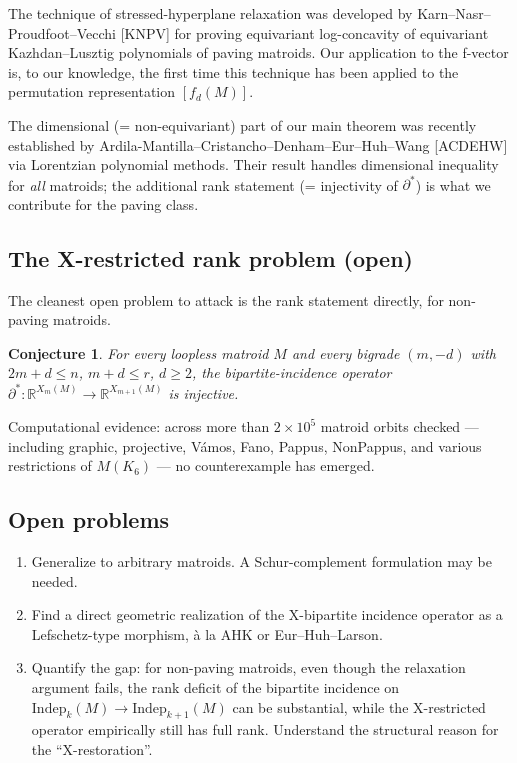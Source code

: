 \documentclass[11pt]{article}
\newtheorem{conjecture}[theorem]{Conjecture}
\theoremstyle{definition}
\newcommand{\Indep}{\mathrm{Indep}}
\begin{document}
The technique of stressed-hyperplane relaxation was developed by Karn--Nasr--Proudfoot--Vecchi [KNPV] for proving equivariant log-concavity of equivariant Kazhdan--Lusztig polynomials of paving matroids. Our application to the f-vector is, to our knowledge, the first time this technique has been applied to the permutation representation $[f_d(M)]$.

The dimensional (= non-equivariant) part of our main theorem was recently established by Ardila-Mantilla--Cristancho--Denham--Eur--Huh--Wang [ACDEHW] via Lorentzian polynomial methods. Their result handles dimensional inequality for \emph{all} matroids; the additional rank statement (= injectivity of $\partial^*$) is what we contribute for the paving class.

\subsection{The X-restricted rank problem (open)}

The cleanest open problem to attack is the rank statement directly, for non-paving matroids.

\begin{conjecture}
For every loopless matroid $M$ and every bigrade $(m, -d)$ with $2m + d \leq n$, $m + d \leq r$, $d \geq 2$, the bipartite-incidence operator $\partial^*: \mathbb{R}^{X_m(M)} \to \mathbb{R}^{X_{m+1}(M)}$ is injective.
\end{conjecture}

Computational evidence: across more than $2 \times 10^5$ matroid orbits checked --- including graphic, projective, V\'amos, Fano, Pappus, NonPappus, and various restrictions of $M(K_6)$ --- no counterexample has emerged.

\subsection{Open problems}

\begin{enumerate}[leftmargin=*]
\item Generalize to arbitrary matroids. A Schur-complement formulation may be needed.
\item Find a direct geometric realization of the X-bipartite incidence operator as a Lefschetz-type morphism, \`a la AHK or Eur--Huh--Larson.
\item Quantify the gap: for non-paving matroids, even though the relaxation argument fails, the rank deficit of the bipartite incidence on $\Indep_k(M) \to \Indep_{k+1}(M)$ can be substantial, while the X-restricted operator empirically still has full rank. Understand the structural reason for the ``X-restoration''.
\end{enumerate}
\end{document}
